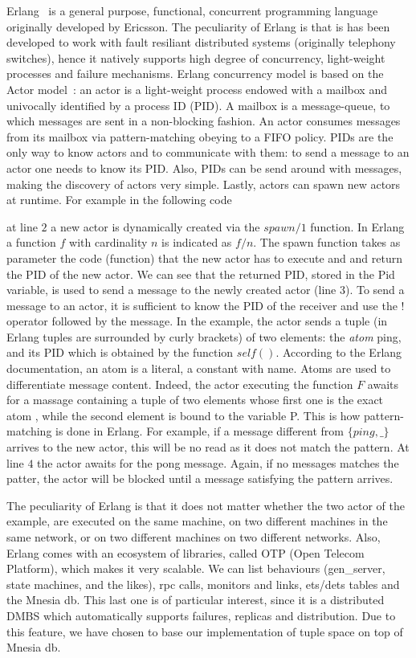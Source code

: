 Erlang~\cite{Cesarini,Armstrong} is a general purpose, functional, concurrent programming language originally developed by Ericsson.
The peculiarity of Erlang is that is has been developed to work with fault resiliant distributed systems (originally telephony switches), hence it natively supports high degree of concurrency, light-weight processes and  failure mechanisms. Erlang concurrency model is based on the Actor model~\cite{actor}: an actor is a light-weight process endowed with a mailbox and univocally identified by a process ID (PID). A mailbox is a message-queue, to which messages are sent in a non-blocking fashion. An actor consumes messages from its mailbox  via pattern-matching obeying to a FIFO policy. 
%
%
PIDs are the only way to know actors and to communicate with them: to send a message to an actor one needs to know its PID. Also, PIDs can be send around with messages, making the discovery of actors very simple. Lastly, actors can spawn new actors at runtime. For example in the following code

at line $2$ a new actor is dynamically created via the $spawn/1$ function. In Erlang a function $f$ with cardinality $n$ is indicated as $f/n$. The spawn function takes as parameter the code (function) that the new actor has to execute and
 and return the PID of the new actor. We can see that the returned PID, stored in the Pid variable, is used to send a message to the newly created actor (line $3$). To send a message to an actor, it is sufficient to know the PID of the receiver and use the $!$ operator followed by the message. In the example, the actor sends a tuple (in Erlang tuples are surrounded by curly brackets) of two elements: the \textit{atom} ping, and its PID which is obtained by the function $self()$. According to the Erlang documentation, an atom is a literal, a constant with name. Atoms are used to differentiate message content. Indeed, the actor executing the function $F$ awaits for a massage containing a tuple of two elements whose first one is the exact atom , while the second element is bound to the variable P. This is how pattern-matching is done in Erlang. For example, if a message different from  $\{ping,\_\}$ arrives to the new actor, this will be no read as it does not match the pattern. At line $4$ the actor awaits for the pong message. Again, if no messages matches the patter, the actor will be blocked until a message satisfying the pattern arrives.
 
 The peculiarity of Erlang is that it does not matter whether the two actor of the example, are executed on the same machine, on two different machines in the same network, or on two different machines on two different networks. Also, Erlang comes with an ecosystem of libraries, called OTP (Open Telecom Platform), which makes it very scalable. We can list behaviours (gen_server, state machines, and the likes), rpc calls, monitors and links, ets/dets tables and the Mnesia db. This last one is of particular interest, since it is a distributed DMBS which automatically supports failures, replicas and distribution. Due to this feature, we have chosen to base our implementation of tuple space on top of Mnesia db.